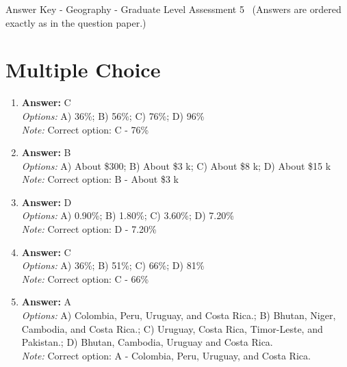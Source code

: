 \documentclass[12pt]{article}
\begin{document}
\begin{center}
Answer Key - Geography - Graduate Level Assessment 5 \
\small (Answers are ordered exactly as in the question paper.)
\end{center}

\section*{Multiple Choice}
\begin{enumerate}[label=\arabic*.]
\item \textbf{Answer:} C
\\ \textit{Options:} A) 36\%; B) 56\%; C) 76\%; D) 96\%
\\ \textit{Note:} Correct option: C - 76\%
\item \textbf{Answer:} B
\\ \textit{Options:} A) About \$300; B) About \$3 k; C) About \$8 k; D) About \$15 k
\\ \textit{Note:} Correct option: B - About \$3 k
\item \textbf{Answer:} D
\\ \textit{Options:} A) 0.90\%; B) 1.80\%; C) 3.60\%; D) 7.20\%
\\ \textit{Note:} Correct option: D - 7.20\%
\item \textbf{Answer:} C
\\ \textit{Options:} A) 36\%; B) 51\%; C) 66\%; D) 81\%
\\ \textit{Note:} Correct option: C - 66\%
\item \textbf{Answer:} A
\\ \textit{Options:} A) Colombia, Peru, Uruguay, and Costa Rica.; B) Bhutan, Niger, Cambodia, and Costa Rica.; C) Uruguay, Costa Rica, Timor-Leste, and Pakistan.; D) Bhutan, Cambodia, Uruguay and Costa Rica.
\\ \textit{Note:} Correct option: A - Colombia, Peru, Uruguay, and Costa Rica.
\end{enumerate}
\end{document}
